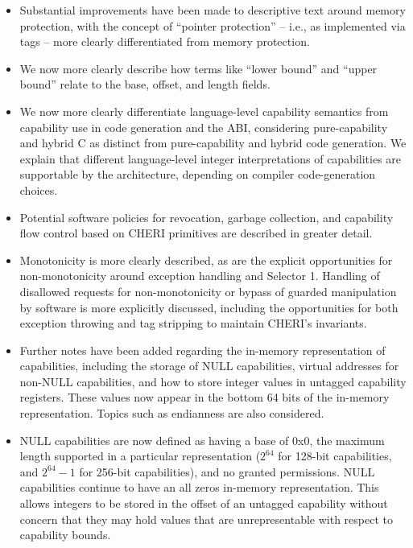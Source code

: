 \begin{itemize}
\item Substantial improvements have been made to descriptive text around memory
protection, with the concept of ``pointer protection'' -- i.e., as
implemented via tags -- more clearly differentiated from memory protection.

\item We now more clearly describe how terms like ``lower bound'' and ``upper
bound'' relate to the base, offset, and length fields.

\item We now more clearly differentiate language-level capability semantics
from capability use in code generation and the ABI, considering
pure-capability and hybrid C as distinct from pure-capability and hybrid code
generation.
We explain that different language-level integer interpretations of
capabilities are supportable by the architecture, depending on compiler
code-generation choices.

\item Potential software policies for revocation, garbage collection, and
capability flow control based on CHERI primitives are described in greater
detail.

\item Monotonicity is more clearly described, as are the explicit
opportunities for non-monotonicity around exception handling and
 Selector 1.
Handling of disallowed requests for non-monotonicity or bypass of guarded
manipulation by software is more explicitly discussed, including the
opportunities for both exception throwing and tag stripping to maintain
CHERI's invariants.

\item Further notes have been added regarding the in-memory representation of
capabilities, including the storage of NULL capabilities, virtual addresses
for non-NULL capabilities, and how to store integer values in untagged
capability registers.
These values now appear in the bottom 64 bits of the in-memory
representation.
Topics such as endianness are also considered.

\item NULL capabilities are now defined as having a base of 0x0, the maximum
length supported in a particular representation ($2^{64}$ for 128-bit
capabilities, and $2^{64} - 1$ for 256-bit capabilities), and no granted
permissions.
NULL capabilities continue to have an all zeros in-memory representation.
This allows integers to be stored in the offset of an untagged capability
without concern that they may hold values that are unrepresentable with
respect to capability bounds.


\end{itemize}
